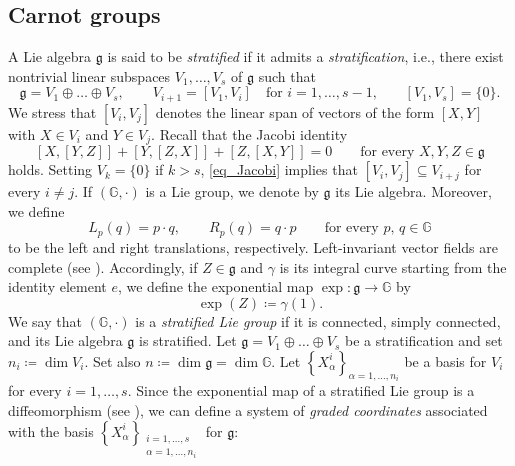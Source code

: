 \documentclass[11pt]{amsart}
\theoremstyle{plain}
\theoremstyle{definition}
\theoremstyle{remark}
\numberwithin{equation}{section}
\begin{document}
\subsection{Carnot groups}
A Lie algebra $\mathfrak{g}$ is said to be \emph{stratified} if it admits a \emph{stratification}, i.e., there exist nontrivial linear subspaces $V_1, \dots, V_s$ of $\mathfrak{g}$ such that
\begin{equation}\label{defcarnotgroup}
\mathfrak{g}= V_1 \oplus \dots \oplus V_s, \qquad V_{i+1} = [V_1,V_i] \quad \text{for $i=1,\dots,s-1$,} \qquad [V_1,V_s]=\{0\}.
\end{equation}
We stress that $[V_i,V_j]$ denotes the linear span of vectors of the form $[X,Y]$ with $X \in V_i$ and $Y \in V_j$. Recall that the Jacobi identity
\begin{equation} \label{eq_Jacobi}
[X,[Y,Z]]+[Y,[Z,X]]+[Z,[X,Y]]=0 \qquad \text{for every $X,Y,Z \in\mathfrak{g}$}
\end{equation}
holds. Setting $V_k=\{0\}$ if $k>s$, \eqref{eq_Jacobi} implies that $[V_i,V_j] \subseteq V_{i+j}$ for every $i \neq j$. If $(\mathbb{G},\cdot)$ is a Lie group, we denote by $\mathfrak{g}$ its Lie algebra. Moreover, we define
\begin{equation*}
L_p(q) = p \cdot q, \qquad R_p(q) = q \cdot p \qquad \text{for every $p,\,q \in \mathbb{G}$}
\end{equation*}
to be the left and right translations, respectively. Left-invariant vector fields are complete (see \cite[Theorem 9.18]{MR2954043}). Accordingly, if $Z \in \mathfrak{g}$ and $\gamma$ is its integral curve starting from the identity element $e$, we define the exponential map $\exp : \mathfrak{g} \to \mathbb{G}$ by
\begin{equation*}
\exp(Z) \coloneqq \gamma(1).
\end{equation*}
We say that $(\mathbb{G},\cdot)$ is a \emph{stratified Lie group} if it is connected, simply connected, and its Lie algebra $\mathfrak{g}$ is stratified. Let $\mathfrak{g}=V_1 \oplus \dots \oplus V_s$ be a stratification and set $n_i \coloneqq \dim V_i$. Set also $n \coloneqq \dim \mathfrak{g} = \dim \mathbb{G}$. Let $\left\{X^i_\alpha\right\}_{\alpha=1,\dots,n_i}$ be a basis for $V_i$ for every $i=1,\dots,s$. Since the exponential map of a stratified Lie group is a diffeomorphism (see \cite[Theorem 3.6.2]{MR746308}), we can define a system of \emph{graded coordinates} associated with the basis $\left\{X^i_\alpha\right\}_{\substack{i=1,\dots,s \\ \alpha=1,\dots,n_i}}$ for $\mathfrak{g}$:
\end{document}
